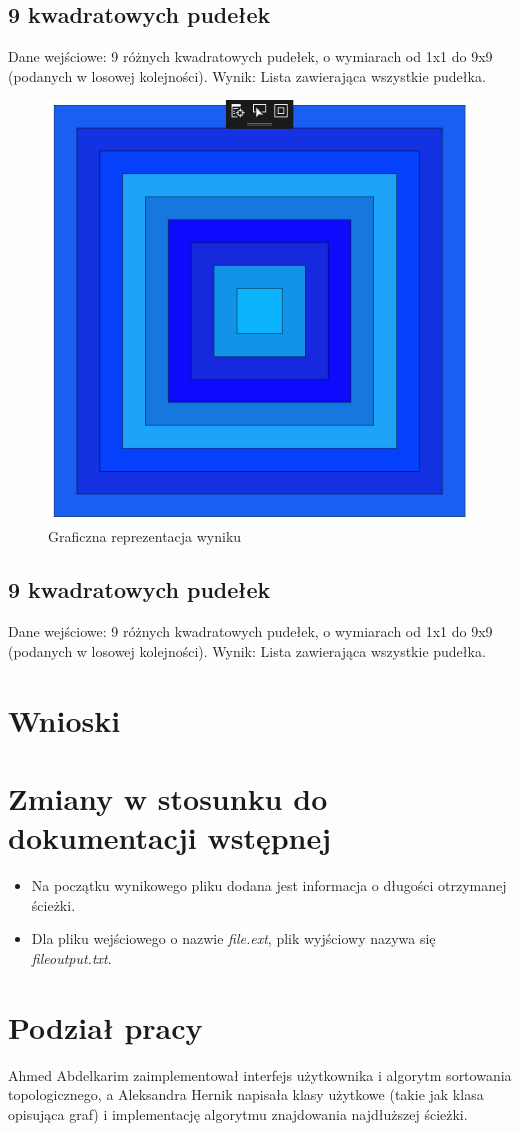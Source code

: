 \documentclass{article}
\begin{document}
\subsection{9 kwadratowych pudełek}
Dane wejściowe: 9 różnych kwadratowych pudełek, o wymiarach od 1x1 do 9x9 (podanych w losowej kolejności). 
Wynik: Lista zawierająca wszystkie pudełka.
\begin{figure}[H]
\caption{Graficzna reprezentacja wyniku}
\includegraphics{square_boxes_res.png}
\end{figure}

\subsection{9 kwadratowych pudełek}
Dane wejściowe: 9 różnych kwadratowych pudełek, o wymiarach od 1x1 do 9x9 (podanych w losowej kolejności). 
Wynik: Lista zawierająca wszystkie pudełka.


\section{Wnioski}

\section{Zmiany w stosunku do dokumentacji wstępnej}
\begin{itemize}
\item Na początku wynikowego pliku dodana jest informacja o długości otrzymanej ścieżki.
\item Dla pliku wejściowego o nazwie \textit{file.ext}, plik wyjściowy nazywa się \textit{file\textunderscore output.txt}.
\end{itemize}

\section{Podział pracy}
Ahmed Abdelkarim zaimplementował interfejs użytkownika i algorytm sortowania topologicznego, a Aleksandra Hernik napisała klasy użytkowe (takie jak klasa opisująca graf) i implementację algorytmu znajdowania najdłuższej ścieżki.
\end{document}
